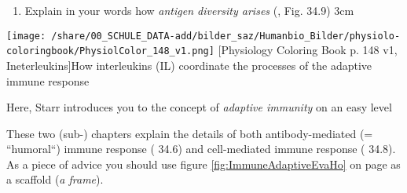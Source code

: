 	\begin{enumerate}[resume, leftmargin=*]
	\item  Explain in your words how \textit{antigen diversity arises} (, Fig. 34.9)
		\Loesung{ \vspace{3cm}} {3cm}
	\end{enumerate}

		\hspace{-2cm}
		\begin{minipage}{18cm}
		  \texttt{[image: /share/00\_SCHULE\_DATA-add/bilder\_saz/Humanbio\_Bilder/physiolo-coloringbook/PhysiolColor\_148\_v1.png]}
		  [Physiology Coloring Book p. 148 v1, Ineterleukins]{How interleukins (IL) coordinate the processes of the adaptive immune response}
		  \label{fig:Interleukins}
		\end{minipage}

		\begin{mdframed}[style=exampledefault, userdefinedwidth=12cm,frametitle={Starr, chapter 34.5}\label{mat:BEISPIELMATERIAL}]
			Here, Starr introduces you to the concept of \emph{adaptive immunity} on an easy level
		\end{mdframed}
\vfill
				\begin{mdframed}[style=exampledefault, userdefinedwidth=12cm,frametitle={Starr chapters 24.6 and 34.8}\label{mat:BEISPIELMATERIAL}]
			These two (sub-) chapters explain the details of both antibody-mediated (= ``humoral``) immune response ( 34.6) and cell-mediated immune response (  34.8). As a piece of advice you should use figure \ref{fig:ImmuneAdaptiveEvaHo} on page \pageref{fig:ImmuneAdaptiveEvaHo} as a scaffold (\textit{a frame}).
		\end{mdframed}



